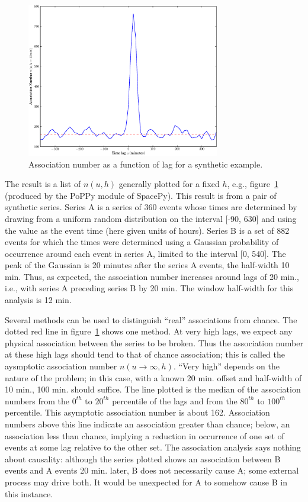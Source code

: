 \documentclass[letterpaper,11pt]{article}
\begin{document}
\begin{figure}
\begin{center}
\includegraphics[width=0.75\textwidth]{figures/no_ci.eps}
\caption{\label{fig:assoc_only}Association number as a function of lag
for a synthetic example.}
\end{center}
\end{figure}

The result is a list of $n(u, h)$ generally plotted for a fixed $h$,
e.g., figure~\ref{fig:assoc_only} (produced by the PoPPy module of
SpacePy). This result is from a pair of synthetic series. Series A is
a series of 360 events whose times are determined by drawing from a
uniform random distribution on the interval [-90, 630] and using the
value as the event time (here given units of hours). Series B is a set
of 882 events for which the times were determined using a Gaussian
probability of occurrence around each event in series A, limited to
the interval [0, 540]. The peak of the Gaussian is 20 minutes after
the series A events, the half-width 10 min. Thus, as expected,
the association number increases around lags of 20 min., i.e., with
series A preceding series B by 20 min. The window half-width
for this analysis is 12 min.

Several methods can be used to distinguish ``real'' associations from
chance. The dotted red line in figure~\ref{fig:assoc_only} shows one
method. At very high lags, we expect any physical association between
the series to be broken. Thus the association number at these high
lags should tend to that of chance association; this is called the
aysmptotic association number $n(u\rightarrow\infty, h)$.
``Very high'' depends on the nature of the problem; in this
case, with a known 20 min. offset and half-width of 10 min.,
100 min. should suffice. The line plotted is the
median of the association numbers from the $0^{th}$ to $20^{th}$ percentile of
the lags and from the $80^{th}$ to $100^{th}$ percentile. This asymptotic
association number is about 162.  Association numbers
above this line indicate an association greater than chance; below, an
association less than chance, implying a reduction in occurrence of
one set of events at some lag relative to the other set. The
association analysis says nothing about causality: although the series
plotted shows an association between B events and A events 20
min. later, B does not necessarily cause A; some external process
may drive both. It would be unexpected for A to somehow cause B in
this instance.
\end{document}
